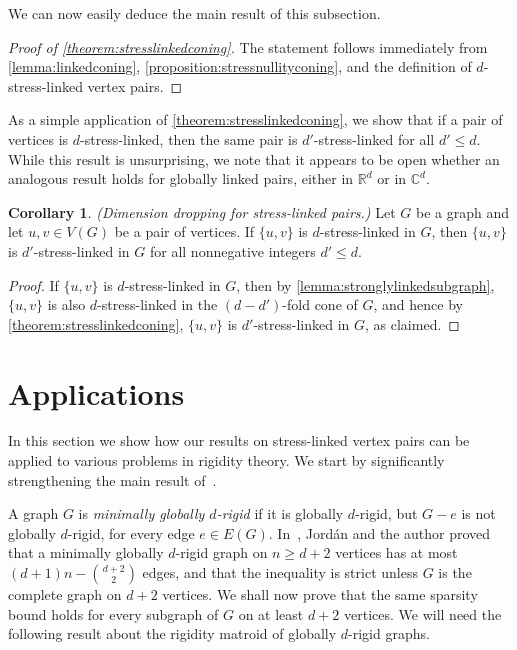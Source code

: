 \documentclass[11pt,a4paper,dvipsnames]{scrartcl}
\theoremstyle{definition}
\newtheorem{corollary}[theorem]{Corollary}
\newcommand{\RR}{\mathbb{R}}
\newcommand{\CC}{\mathbb{C}}
\newcommand{\globrig}[1]{globally $#1$-rigid}
\newcommand{\strongly}[1]{${#1}$-stress-linked}
\begin{document}
We can now easily deduce the main result of this subsection.

\begin{proof}[Proof of \cref{theorem:stresslinkedconing}]
    The statement follows immediately from \cref{lemma:linkedconing}, \cref{proposition:stressnullityconing}, and the definition of $d$-stress-linked vertex pairs.
\end{proof}

As a simple application of \cref{theorem:stresslinkedconing}, we show that if a pair of vertices is \strongly{d}, then the same pair is \strongly{d'} for all $d' \leq d$. While this result is unsurprising, we note that it appears to be open whether an analogous result holds for globally linked pairs, either in $\RR^d$ or in $\CC^d$.

\begin{corollary}\label{corollary:dimensiondropping} \emph{(Dimension dropping for stress-linked pairs.)} \newline
    Let $G$ be a graph and let $u,v \in V(G)$ be a pair of vertices. If $\{u,v\}$ is \strongly{d} in $G$, then $\{u,v\}$ is \strongly{d'} in $G$ for all nonnegative integers $d' \leq d$.
\end{corollary}
\begin{proof}
    If $\{u,v\}$ is \strongly{d} in $G$, then by \cref{lemma:stronglylinkedsubgraph}, $\{u,v\}$ is also \strongly{d} in the $(d-d')$-fold cone of $G$, and hence by \cref{theorem:stresslinkedconing}, $\{u,v\}$ is \strongly{d'} in $G$, as claimed.
\end{proof}









\section{Applications}\label{section:applications}


In this section we show how our results on stress-linked vertex pairs can be applied to various problems in rigidity theory. We start by significantly strengthening the main result of~\cite{garamvolgyi.jordan_2023}.

A graph $G$ is \emph{minimally \globrig{d}} if it is \globrig{d}, but $G-e$ is not \globrig{d}, for every edge $e \in E(G)$. In~\cite{garamvolgyi.jordan_2023}, Jordán and the author proved that a minimally \globrig{d} graph on $n \geq d+2$ vertices has at most $(d+1)n - \binom{d+2}{2}$ edges, and that the inequality is strict unless $G$ is the complete graph on $d+2$ vertices. We shall now prove that the same sparsity bound holds for every subgraph of $G$ on at least $d+2$ vertices. We will need the following result about the rigidity matroid of \globrig{d} graphs. 
\end{document}
